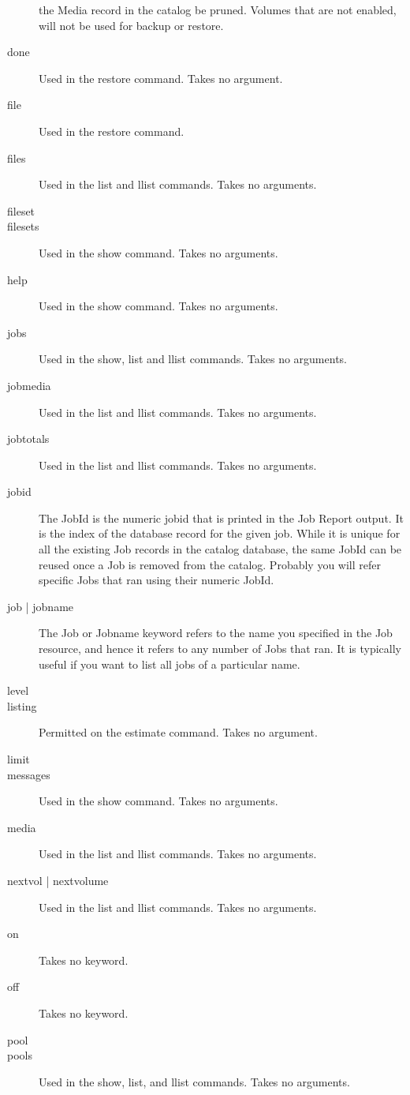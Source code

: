 \begin{description}
  the Media record in the catalog be pruned. Volumes that are not enabled,
  will not be used for backup or restore.
\item [done]
  Used in the restore command. Takes no argument.
\item [file]
  Used in the restore command.
\item [files]
  Used in the list and llist commands. Takes no arguments.
\item [fileset]
\item [filesets]
  Used in the show command. Takes no arguments.
\item [help]
  Used in the show command. Takes no arguments.
\item [jobs]
  Used in the show, list and llist commands. Takes no arguments.
\item [jobmedia]
  Used in the list and llist commands. Takes no arguments.
\item [jobtotals]
  Used in the list and llist commands. Takes no arguments.
\item [jobid]
  The JobId is the numeric jobid that is printed in the Job
  Report output. It is the index of the database record for the
  given job. While it is unique for all the existing Job records
  in the catalog database, the same JobId can be reused once a
  Job is removed from the catalog. Probably you will refer
  specific Jobs that ran using their numeric JobId.
\item [job | jobname]
  The Job or Jobname keyword refers to the name you specified
  in the Job resource, and hence it refers to any number of
  Jobs that ran.  It is typically useful if you want to list
  all jobs of a particular name.
\item [level]
\item [listing]
  Permitted on the estimate command. Takes no argument.
\item [limit]
\item [messages]
  Used in the show command. Takes no arguments.
\item [media]
  Used in the list and llist commands. Takes no arguments.
\item [nextvol | nextvolume]
  Used in the list and llist commands. Takes no arguments.
\item [on]
  Takes no keyword.
\item [off]
  Takes no keyword.
\item [pool]
\item [pools]
  Used in the show, list, and llist commands. Takes no arguments.

\end{description}
